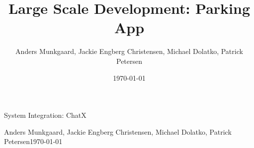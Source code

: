 \documentclass[a4paper,12pt]{report}
\title{Large Scale Development: Parking App}
\author{Anders Munkgaard, Jackie Engberg Christensen, Michael Dolatko, Patrick Petersen}
\date{\today}
\begin{document}
\begin{titlepage}
\centering
{\LARGE System Integration: ChatX}
\begin{figure}[H]
\centering
\end{figure}

{\large Anders Munkgaard, Jackie Engberg Christensen, Michael Dolatko, Patrick Petersen\linebreak \today}
\end{titlepage}


\tableofcontents








\newpage



\end{document}
